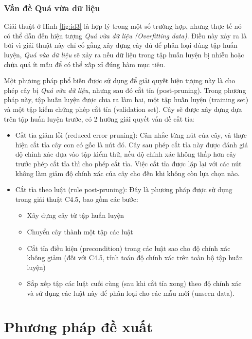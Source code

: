 \documentclass[12pt]{report}
\begin{document}
			\subsection*{Vấn đề Quá vừa dữ liệu}
				\par Giải thuật ở Hình \ref{fig:id3} là hợp lý trong một số trường hợp, nhưng thực tế nó có thể dẫn đến hiện tượng \textit{Quá vừa dữ liệu (Overfitting data)}. Điều này xảy ra là bởi vì giải thuật này chỉ cố gắng xây dựng cây đủ để phân loại đúng tập huấn luyện, \textit{Quá vừa dữ liệu} sẽ xảy ra nếu dữ liệu trong tập huấn luyện bị nhiễu hoặc chứa quá ít mẫu để có thể xấp xỉ đúng hàm mục tiêu.
				\par Một phương pháp phổ biến được sử dụng để giải quyết hiện tượng này là cho phép cây bị \textit{Quá vừa dữ liệu}, nhưng sau đó cắt tỉa (post-pruning). Trong phương pháp này, tập huấn luyện được chia ra làm hai, một tập huấn luyện (training set) và một tập kiểm chứng phép cắt tỉa (validation set). Cây sẽ được xây dựng dựa trên tập huấn luyện trước, có 2 hướng giải quyết vấn đề cắt tỉa:
				\begin{itemize}
				\item{Cắt tỉa giảm lỗi (reduced error pruning): Cân nhắc từng nút của cây, và thực hiện cắt tỉa cây con có gốc là nút đó. Cây sau phép cắt tỉa này được đánh giá độ chính xác dựa vào tập kiểm thử, nếu độ chính xác không thấp hơn cây trước phép cắt tỉa thì cho phép cắt tỉa. Việc cắt tỉa được lặp lại với các nút không làm giảm độ chính xác của cây cho đến khi không còn lựa chọn nào.}
				\item{Cắt tỉa theo luật (rule post-pruning): Đây là phương pháp được sử dụng trong giải thuật C4.5, bao gồm các bước:
					\begin{itemize}
						\item{Xây dựng cây từ tập huấn luyện}
						\item{Chuyển cây thành một tập các luật}
						\item{Cắt tỉa điều kiện (precondition) trong các luật sao cho độ chính xác không giảm (đối với C4.5, tính toán độ chính xác trên toàn bộ tập huấn luyện)}
						\item{Sắp xếp tập các luật cuối cùng (sau khi cắt tỉa xong) theo độ chính xác và sử dụng các luật này để phân loại cho các mẫu mới (unseen data).}
					\end{itemize}}				
				\end{itemize}

	\chapter{Phương pháp đề xuất}	
\end{document}
